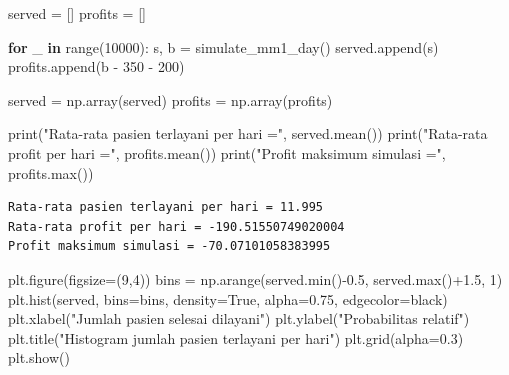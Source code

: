 \documentclass[
  letterpaper,
  DIV=11,
  numbers=noendperiod]{scrreprt}
\newenvironment{Shaded}{\begin{snugshade}}{\end{snugshade}}
\newcommand{\BuiltInTok}[1]{\textcolor[rgb]{0.00,0.23,0.31}{#1}}
\newcommand{\ControlFlowTok}[1]{\textcolor[rgb]{0.00,0.23,0.31}{\textbf{#1}}}
\newcommand{\DecValTok}[1]{\textcolor[rgb]{0.68,0.00,0.00}{#1}}
\newcommand{\FloatTok}[1]{\textcolor[rgb]{0.68,0.00,0.00}{#1}}
\newcommand{\KeywordTok}[1]{\textcolor[rgb]{0.00,0.23,0.31}{\textbf{#1}}}
\newcommand{\NormalTok}[1]{\textcolor[rgb]{0.00,0.23,0.31}{#1}}
\newcommand{\OperatorTok}[1]{\textcolor[rgb]{0.37,0.37,0.37}{#1}}
\newcommand{\StringTok}[1]{\textcolor[rgb]{0.13,0.47,0.30}{#1}}
\newcommand{\VariableTok}[1]{\textcolor[rgb]{0.07,0.07,0.07}{#1}}
\begin{document}
\begin{Shaded}
\begin{Highlighting}[]
\NormalTok{served }\OperatorTok{=}\NormalTok{ []}
\NormalTok{profits }\OperatorTok{=}\NormalTok{ []}

\ControlFlowTok{for}\NormalTok{ \_ }\KeywordTok{in} \BuiltInTok{range}\NormalTok{(}\DecValTok{10000}\NormalTok{):}
\NormalTok{    s, b }\OperatorTok{=}\NormalTok{ simulate\_mm1\_day()}
\NormalTok{    served.append(s)}
\NormalTok{    profits.append(b }\OperatorTok{{-}} \DecValTok{350} \OperatorTok{{-}} \DecValTok{200}\NormalTok{)}

\NormalTok{served }\OperatorTok{=}\NormalTok{ np.array(served)}
\NormalTok{profits }\OperatorTok{=}\NormalTok{ np.array(profits)}

\BuiltInTok{print}\NormalTok{(}\StringTok{"Rata{-}rata pasien terlayani per hari ="}\NormalTok{, served.mean())}
\BuiltInTok{print}\NormalTok{(}\StringTok{"Rata{-}rata profit per hari ="}\NormalTok{, profits.mean())}
\BuiltInTok{print}\NormalTok{(}\StringTok{"Profit maksimum simulasi ="}\NormalTok{, profits.}\BuiltInTok{max}\NormalTok{())}
\end{Highlighting}
\end{Shaded}

\begin{verbatim}
Rata-rata pasien terlayani per hari = 11.995
Rata-rata profit per hari = -190.51550749020004
Profit maksimum simulasi = -70.07101058383995
\end{verbatim}

\begin{Shaded}
\begin{Highlighting}[]
\NormalTok{plt.figure(figsize}\OperatorTok{=}\NormalTok{(}\DecValTok{9}\NormalTok{,}\DecValTok{4}\NormalTok{))}
\NormalTok{bins }\OperatorTok{=}\NormalTok{ np.arange(served.}\BuiltInTok{min}\NormalTok{()}\OperatorTok{{-}}\FloatTok{0.5}\NormalTok{, served.}\BuiltInTok{max}\NormalTok{()}\OperatorTok{+}\FloatTok{1.5}\NormalTok{, }\DecValTok{1}\NormalTok{)}
\NormalTok{plt.hist(served, bins}\OperatorTok{=}\NormalTok{bins, density}\OperatorTok{=}\VariableTok{True}\NormalTok{, alpha}\OperatorTok{=}\FloatTok{0.75}\NormalTok{, edgecolor}\OperatorTok{=}\StringTok{\textquotesingle{}black\textquotesingle{}}\NormalTok{)}
\NormalTok{plt.xlabel(}\StringTok{"Jumlah pasien selesai dilayani"}\NormalTok{)}
\NormalTok{plt.ylabel(}\StringTok{"Probabilitas relatif"}\NormalTok{)}
\NormalTok{plt.title(}\StringTok{"Histogram jumlah pasien terlayani per hari"}\NormalTok{)}
\NormalTok{plt.grid(alpha}\OperatorTok{=}\FloatTok{0.3}\NormalTok{)}
\NormalTok{plt.show()}
\end{Highlighting}
\end{Shaded}
\end{document}
